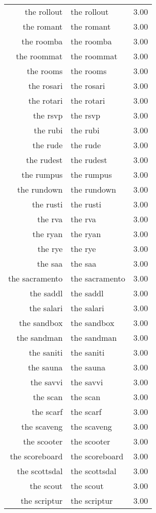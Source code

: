 \begin{table}[ht]
\begin{tabular}{rlr}
  the rollout & the rollout & 3.00 \\ 
  the romant & the romant & 3.00 \\ 
  the roomba & the roomba & 3.00 \\ 
  the roommat & the roommat & 3.00 \\ 
  the rooms & the rooms & 3.00 \\ 
  the rosari & the rosari & 3.00 \\ 
  the rotari & the rotari & 3.00 \\ 
  the rsvp & the rsvp & 3.00 \\ 
  the rubi & the rubi & 3.00 \\ 
  the rude & the rude & 3.00 \\ 
  the rudest & the rudest & 3.00 \\ 
  the rumpus & the rumpus & 3.00 \\ 
  the rundown & the rundown & 3.00 \\ 
  the rusti & the rusti & 3.00 \\ 
  the rva & the rva & 3.00 \\ 
  the ryan & the ryan & 3.00 \\ 
  the rye & the rye & 3.00 \\ 
  the saa & the saa & 3.00 \\ 
  the sacramento & the sacramento & 3.00 \\ 
  the saddl & the saddl & 3.00 \\ 
  the salari & the salari & 3.00 \\ 
  the sandbox & the sandbox & 3.00 \\ 
  the sandman & the sandman & 3.00 \\ 
  the saniti & the saniti & 3.00 \\ 
  the sauna & the sauna & 3.00 \\ 
  the savvi & the savvi & 3.00 \\ 
  the scan & the scan & 3.00 \\ 
  the scarf & the scarf & 3.00 \\ 
  the scaveng & the scaveng & 3.00 \\ 
  the scooter & the scooter & 3.00 \\ 
  the scoreboard & the scoreboard & 3.00 \\ 
  the scottsdal & the scottsdal & 3.00 \\ 
  the scout & the scout & 3.00 \\ 
  the scriptur & the scriptur & 3.00 \\ 

\end{tabular}
\end{table}
